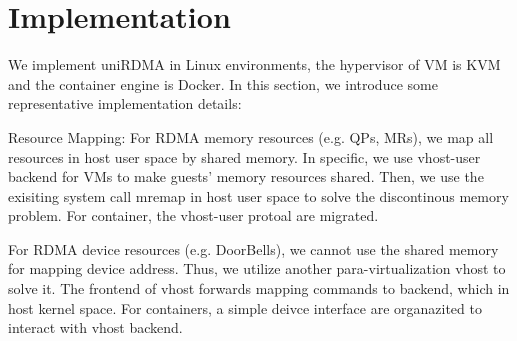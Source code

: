 \section{Implementation}
 We implement uniRDMA in Linux environments, the hypervisor of VM is KVM and the container engine is Docker. In this section, we introduce some representative implementation details:
 
 Resource Mapping: For RDMA memory resources (e.g. QPs, MRs), we map all resources in host user space by shared memory. In specific, we use vhost-user backend for VMs to make guests' memory resources shared. Then, we use the exisiting system call mremap in host user space to solve the discontinous memory problem. For container, the vhost-user protoal are migrated. 
 
 For RDMA device resources (e.g. DoorBells), we cannot use the shared memory for mapping device address. Thus, we utilize another para-virtualization vhost to solve it. The frontend of vhost forwards mapping commands to backend, which in host kernel space. For containers, a simple deivce interface are organazited to interact with vhost backend.
 
